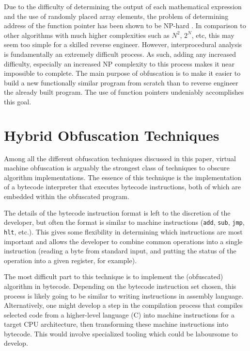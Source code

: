 \documentclass[conference]{IEEEtran}
\begin{document}
Due to the difficulty of determining the output of each mathematical expression and the use of randomly placed array elements, the problem of determining address of the function pointer has been shown to be NP-hard \cite{b4}. In comparison to other algorithms with much higher complexities such as $N^{2}$, $2^{N}$, etc, this may seem too simple for a skilled reverse engineer. However, interprocedural analysis is fundamentally an extremely difficult process. As such, adding any increased difficulty, especially an increased NP complexity to this process makes it near impossible to complete. The main purpose of obfuscation is to make it easier to build a new functionally similar program from scratch than to reverse engineer the already built program. The use of function pointers undeniably accomplishes this goal.

\section{Hybrid Obfuscation Techniques}
\label{sec:hybrid-techniques}
Among all the different obfuscation techniques discussed in this paper, virtual machine obfuscation is arguably the strongest class of techniques to obscure algorithm implementations. The essence of this technique is the implementation of a bytecode interpreter that executes bytecode instructions, both of which are embedded within the obfuscated program.

The details of the bytecode instruction format is left to the discretion of the developer, but often the format is similar to machine instructions (\texttt{add}, \texttt{sub}, \texttt{jmp}, \texttt{hlt}, etc.). This gives some flexibility in determining which instructions are most important and allows the developer to combine common operations into a single instruction (reading a byte from standard input, and putting the status of the operation into a given register, for example).

The most difficult part to this technique is to implement the (obfuscated) algorithm in bytecode. Depending on the bytecode instruction set chosen, this process is likely going to be similar to writing instructions in assembly language. Alternatively, one might develop a step in the compilation process that compiles selected code from a higher-level language (C) into machine instructions for a target CPU architecture, then transforming these machine instructions into bytecode. This would involve specialized tooling which could be laboursome to develop.
\end{document}
